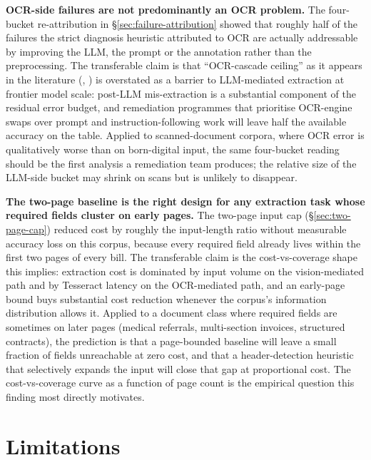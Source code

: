 \textbf{OCR-side failures are not predominantly an OCR problem.} The
four-bucket re-attribution in \S\ref{sec:failure-attribution} showed that
roughly half of the failures the strict diagnosis heuristic attributed to
OCR are actually addressable by improving the LLM, the prompt or the
annotation rather than the preprocessing. The transferable claim is that
``OCR-cascade ceiling'' as it appears in the literature
(\cite{lopresti2009ocr}, \cite{nguyen2021post}) is overstated as a barrier
to LLM-mediated extraction at frontier model scale: post-LLM mis-extraction
is a substantial component of the residual error budget, and remediation
programmes that prioritise OCR-engine swaps over prompt and
instruction-following work will leave half the available accuracy on the
table. Applied to scanned-document corpora, where OCR error is qualitatively
worse than on born-digital input, the same four-bucket reading should be the
first analysis a remediation team produces; the relative size of the
LLM-side bucket may shrink on scans but is unlikely to disappear.

\textbf{The two-page baseline is the right design for any extraction task
whose required fields cluster on early pages.} The two-page input cap
(\S\ref{sec:two-page-cap}) reduced cost by roughly the input-length ratio
without measurable accuracy loss on this corpus, because every required
field already lives within the first two pages of every bill. The
transferable claim is the cost-vs-coverage shape this implies: extraction
cost is dominated by input volume on the vision-mediated path and by
Tesseract latency on the OCR-mediated path, and an early-page bound buys
substantial cost reduction whenever the corpus's information distribution
allows it. Applied to a document class where required fields are sometimes
on later pages (medical referrals, multi-section invoices, structured
contracts), the prediction is that a page-bounded baseline will leave a
small fraction of fields unreachable at zero cost, and that a
header-detection heuristic that selectively expands the input will close
that gap at proportional cost. The cost-vs-coverage curve as a function of
page count is the empirical question this finding most directly motivates.

\section{Limitations}
\label{sec:conclusion-limitations}

